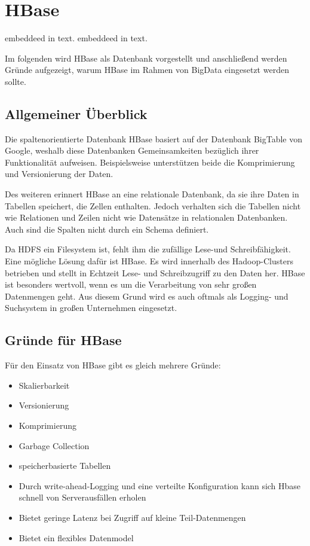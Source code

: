 \section{HBase}

\cite{Redt01} embeddeed in text.
\cite{SpaOd16} embeddeed in text.


Im folgenden wird HBase als Datenbank vorgestellt und anschließend werden Gründe aufgezeigt, warum HBase im Rahmen von BigData eingesetzt werden sollte.

\subsection{Allgemeiner Überblick}
Die spaltenorientierte Datenbank HBase basiert auf der Datenbank BigTable von Google, weshalb diese Datenbanken Gemeinsamkeiten bezüglich ihrer Funktionalität aufweisen. Beispielsweise unterstützen beide die Komprimierung und Versionierung der Daten.

Des weiteren erinnert HBase an eine relationale Datenbank, da sie ihre Daten in Tabellen speichert, die Zellen enthalten. Jedoch verhalten sich die Tabellen nicht wie Relationen und Zeilen nicht wie Datensätze in relationalen Datenbanken. Auch sind die Spalten nicht durch ein Schema definiert.

Da HDFS ein Filesystem ist, fehlt ihm die zufällige Lese-und Schreibfähigkeit. Eine mögliche Lösung dafür ist HBase. Es wird innerhalb des Hadoop-Clusters betrieben und stellt in Echtzeit Lese- und Schreibzugriff zu den Daten her. HBase ist besonders wertvoll, wenn es um die Verarbeitung von sehr großen Datenmengen geht. Aus diesem Grund wird es auch oftmals als Logging- und Suchsystem in großen Unternehmen eingesetzt.

\subsection{Gründe für HBase}
Für den Einsatz von HBase gibt es gleich mehrere Gründe:
\begin{itemize}

\item Skalierbarkeit
\item Versionierung
\item Komprimierung
\item Garbage Collection
\item speicherbasierte Tabellen
\item Durch write-ahead-Logging und eine verteilte Konfiguration kann sich Hbase schnell von Serverausfällen erholen
\item Bietet geringe Latenz bei Zugriff auf kleine Teil-Datenmengen 
\item Bietet ein flexibles Datenmodel
\end{itemize}